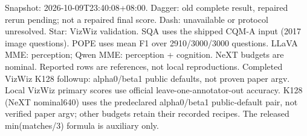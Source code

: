 \documentclass[10pt,a4paper]{article}
\begin{document}
{\footnotesize Snapshot: 2026-10-09T23:40:08+08:00. Dagger: old complete result, repaired rerun pending; not a repaired final score. Dash: unavailable or protocol unresolved. Star: VizWiz validation. SQA uses the shipped CQM-A input (2017 image questions). POPE uses mean F1 over 2910/3000/3000 questions. LLaVA MME: perception; Qwen MME: perception + cognition. NeXT budgets are nominal. Reported rows are references, not local reproductions. Completed VizWiz K128 followup: alpha0/beta1 public defaults, not proven paper argv. Local VizWiz primary scores use official leave-one-annotator-out accuracy. K128 (NeXT nominal640) uses the predeclared alpha0/beta1 public-default pair, not verified paper argv; other budgets retain their recorded recipes. The released min(matches/3) formula is auxiliary only.\par}
\end{document}
